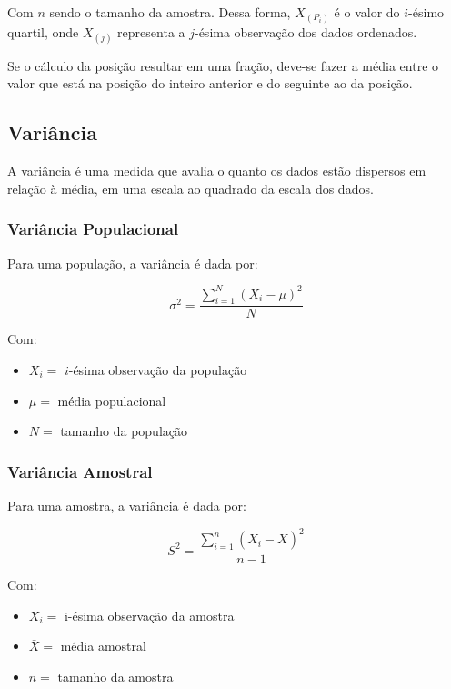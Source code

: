 \documentclass[
  portuguese,
]{estat/estat}
\begin{document}
Com \(n\) sendo o tamanho da amostra. Dessa forma,
\(X_{\left( P_i \right)}\) é o valor do \(i\)-ésimo quartil, onde
\(X_{\left( j \right)}\) representa a \(j\)-ésima observação dos dados
ordenados.

Se o cálculo da posição resultar em uma fração, deve-se fazer a média
entre o valor que está na posição do inteiro anterior e do seguinte ao
da posição.

\subsection{Variância}\label{variuxe2ncia}

A variância é uma medida que avalia o quanto os dados estão dispersos em
relação à média, em uma escala ao quadrado da escala dos dados.

\subsubsection{Variância Populacional}\label{variuxe2ncia-populacional}

Para uma população, a variância é dada por:

\[\sigma^2=\frac{\sum\limits_{i=1}^{N}\left(X_i - \mu\right)^2}{N}\]

Com:

\begin{itemize}
\item
  \(X_i =\) \(i\)-ésima observação da população
\item
  \(\mu =\) média populacional
\item
  \(N =\) tamanho da população
\end{itemize}

\subsubsection{Variância Amostral}\label{variuxe2ncia-amostral}

Para uma amostra, a variância é dada por:

\[S^2=\frac{\sum\limits_{i=1}^{n}\left(X_i - \bar{X}\right)^2}{n-1}\]

Com:

\begin{itemize}
\item
  \(X_i =\) i-ésima observação da amostra
\item
  \(\bar{X} =\) média amostral
\item
  \(n =\) tamanho da amostra
\end{itemize}
\end{document}
